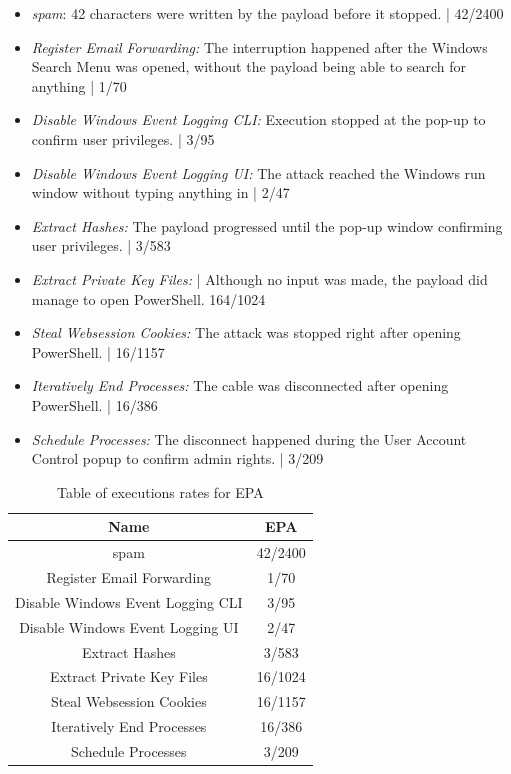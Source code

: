 \begin{itemize}
    \item  \emph{spam}: 42 characters were written by the payload before it stopped. | 42/2400
    \item  \emph{Register Email Forwarding:} The interruption happened after the Windows Search Menu was opened, without the payload being able to search for anything  |  1/70 
    \item  \emph{Disable Windows Event Logging CLI:}  Execution stopped at the pop-up to confirm user privileges. | 3/95
    \item  \emph{Disable Windows Event Logging UI:} The attack reached the Windows run window without typing anything in | 2/47
    \item  \emph{Extract Hashes:}  The payload progressed until the pop-up window confirming user privileges. | 3/583
    \item  \emph{Extract Private Key Files:}  | Although no input was made, the payload did manage to open PowerShell. 164/1024
    \item  \emph{Steal Websession Cookies:} The attack was stopped right after opening PowerShell. | 16/1157
    \item  \emph{Iteratively End Processes:} The cable was disconnected after opening PowerShell. | 16/386
    \item  \emph{Schedule Processes:} The disconnect happened during the User Account Control popup to confirm admin rights. | 3/209
\end{itemize}

\begin{table}[h]
\centering
\begin{tabular}{|c|c|}
\hline
Name & EPA  \\
\hline
spam & 42/2400 \\
\hline
Register Email Forwarding & 1/70  \\
\hline
Disable Windows Event Logging CLI &  3/95 \\
\hline
Disable Windows Event Logging UI & 2/47 \\
\hline
Extract Hashes & 3/583  \\
\hline
Extract Private Key Files & 16/1024 \\
\hline
Steal Websession Cookies & 16/1157 \\
\hline
Iteratively End Processes & 16/386 \\
\hline
Schedule Processes & 3/209 \\
\hline
\end{tabular}
\caption{Table of executions rates for EPA}
\label{table:EPA_results}
\end{table}

